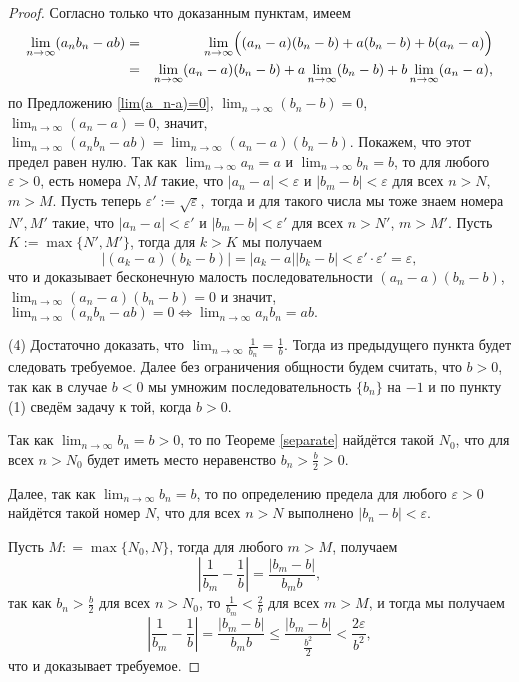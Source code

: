 \begin{proof}
    Согласно только что доказанным пунктам, имеем
    \begin{eqnarray*}
     \lim_{n\to \infty}(a_nb_n - ab) &=&  \lim_{n\to \infty}\Bigl( (a_n-a)(b_n-b) + a(b_n -b) + b(a_n -a) \Bigr)  \\
    &=&  \lim_{n\to \infty} (a_n-a)(b_n-b) + a \lim_{n\to \infty}(b_n -b) + b \lim_{n\to \infty}(a_n -a),
    \end{eqnarray*}
по Предложению \ref{lim(a_n-a)=0}, $\lim_{n\to \infty}(b_n -b) =0$, $\lim_{n\to \infty}(a_n -a)=0$, значит, $\lim_{n\to \infty}(a_nb_n - ab) = \lim_{n \to \infty}(a_n-a)(b_n-b).$ Покажем, что этот предел равен нулю. Так как $\lim_{n\to \infty} a_n  =a$ и $\lim_{n\to \infty}b_n =b$, то для любого $\varepsilon>0$, есть номера $N,M$ такие, что $|a_n - a| <\varepsilon$ и $|b_m -b| < \varepsilon$ для всех $n >N$, $m>M$. Пусть теперь $\varepsilon':=\sqrt{\varepsilon},$ тогда и для такого числа мы тоже знаем номера $N',M'$ такие, что  $|a_n - a| <\varepsilon'$ и $|b_m -b| < \varepsilon'$ для всех $n >N'$, $m>M'$. Пусть $K:= \max\{N',M'\}$, тогда для $k>K$ мы получаем
\[
 |(a_k-a)(b_k-b)| = |a_k -a||b_k - b| < \varepsilon' \cdot \varepsilon' = \varepsilon,
\]
что и доказывает бесконечную малость последовательности $(a_n-a)(b_n-b)$, \ie $\lim_{n \to \infty}(a_n-a)(b_n-b) = 0$ и значит, $\lim_{n\to \infty}(a_nb_n - ab) = 0 \Longleftrightarrow \lim_{n\to \infty}a_nb_n = ab.$

(4) Достаточно доказать, что $\lim_{n \to \infty} \frac{1}{b_n} = \frac{1}{b}$. Тогда из предыдущего пункта будет следовать требуемое. Далее без ограничения общности будем считать, что $b>0$, так как в случае $b<0$ мы умножим последовательность $\{b_n\}$ на $-1$ и по пункту (1) сведём задачу к той, когда $b>0.$

Так как $\lim_{n\to \infty} b_n =b>0$, то по Теореме \ref{separate} найдётся такой $N_0$, что для всех $n>N_0$ будет иметь место неравенство $b_n > \frac{b}{2}>0$.

Далее, так как $\lim_{n\to \infty} b_n =b$, то по определению предела для любого $\varepsilon>0$ найдётся такой номер $N$, что для всех $n>N$ выполнено $|b_n - b|<\varepsilon.$

Пусть $M: = \max\{N_0, N\}$, тогда для любого $m>M$, получаем
\[
\left| \frac{1}{b_m} - \frac{1}{b} \right| = \frac{|b_m-b|}{b_mb},
\]
так как $b_n >\frac{b}{2}$ для всех $n>N_0$, то $\frac{1}{b_m} < \frac{2}{b}$ для всех $m >M$, и тогда мы получаем
\[
\left| \frac{1}{b_m} - \frac{1}{b} \right| = \frac{|b_m-b|}{b_mb} \le \frac{|b_m-b|}{\frac{b^2}{2}} < \frac{2\varepsilon}{b^2},
\]
что и доказывает требуемое.
\end{proof}

